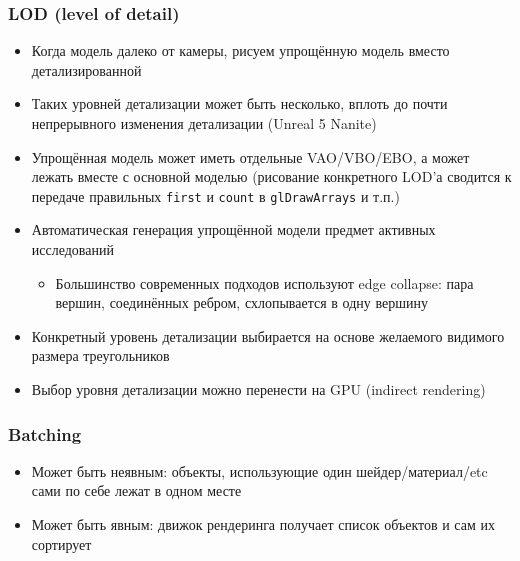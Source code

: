\documentclass{beamer}
\begin{document}
\begin{frame}[fragile]
\fontsize{10pt}{10pt}
\frametitle{LOD (level of detail)}
\begin{itemize}
\item Когда модель далеко от камеры, рисуем упрощённую модель вместо детализированной
\pause
\item Таких уровней детализации может быть несколько, вплоть до почти непрерывного изменения детализации (Unreal 5 Nanite)
\pause
\item Упрощённая модель может иметь отдельные VAO/VBO/EBO, а может лежать вместе с основной моделью (рисование конкретного LOD'а сводится к передаче правильных \verb|first| и \verb|count| в \verb|glDrawArrays| и т.п.)
\pause
\item Автоматическая генерация упрощённой модели \textendash{} предмет активных исследований
\begin{itemize}
\item Большинство современных подходов используют edge collapse: пара вершин, соединённых ребром, схлопывается в одну вершину
\end{itemize}
\pause
\item Конкретный уровень детализации выбирается на основе желаемого видимого размера треугольников
\pause
\item Выбор уровня детализации можно перенести на GPU (indirect rendering)
\end{itemize}
\end{frame}

\begin{frame}[fragile]
\frametitle{Batching}
\begin{itemize}
\item Может быть неявным: объекты, использующие один шейдер/материал/etc сами по себе лежат в одном месте
\pause
\item Может быть явным: движок рендеринга получает список объектов и сам их сортирует
\end{itemize}
\end{frame}
\end{document}
